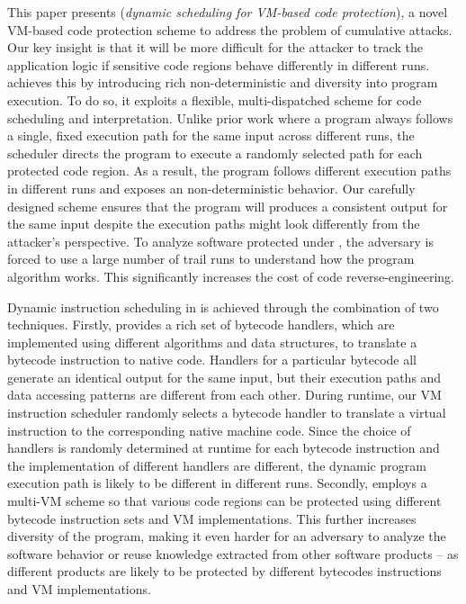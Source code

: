 This paper presents \DSVMP (\emph{dynamic scheduling for VM-based code
protection}), a novel VM-based code protection scheme to address the problem
of cumulative attacks. Our key insight is that it will be more difficult for
the attacker to track the application logic if sensitive code regions behave differently
in different runs. \DSVMP achieves this by introducing rich non-deterministic and
diversity into program execution. To do so, it exploits a flexible,
multi-dispatched scheme for code scheduling and interpretation. Unlike prior
work where a program always follows a single, fixed execution path for the
same input across different runs, the \DSVMP scheduler directs the program to
execute a randomly selected path for each protected code region. As a
result, the program follows different execution paths in different runs and
exposes an non-deterministic behavior. Our carefully designed scheme ensures that
the program will produces a consistent output for the same input despite
the execution paths might look differently from the attacker's perspective. To
analyze software protected under \DSVMP, the adversary is forced to use a
large number of trail runs to understand how the program algorithm works.
This significantly increases the cost of code reverse-engineering.


Dynamic instruction scheduling in \DSVMP is achieved through the combination of two techniques.
Firstly, \DSVMP provides a rich set of bytecode handlers, which are implemented using different algorithms and data structures,
to translate a bytecode instruction to native code.
Handlers for a particular bytecode all generate an identical output for the same input,
but their execution paths and data accessing patterns are different from each other.
During runtime, our VM instruction scheduler randomly selects a  bytecode handler
to translate a virtual instruction to the corresponding native machine code.
Since the choice of handlers is randomly determined at runtime for each bytecode
instruction and the implementation of different handlers are different,
the dynamic program execution path is likely to be different in different runs.
Secondly, \DSVMP employs a multi-VM scheme so that various code regions
can be protected using different bytecode instruction sets and VM implementations.
This further increases diversity of the program, making it even harder for an adversary to analyze
the software behavior or reuse knowledge extracted from other software products
-- as different products are likely to be protected by different bytecodes instructions and VM implementations.


